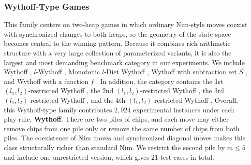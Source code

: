 \documentclass[review]{elsarticle}
\newcommand{\set}[1]{\{ #1 \}}
\newcommand{\tuple}[1]{\langle {#1} \rangle}
\newcommand{\true}{\top}
\newcommand{\statevar}{\mathcal{X}}
\newcommand{\act}{\mathcal{A}}
\newcommand{\constraint}{\mathcal{C}}
\newcommand{\estate}{\mathcal{E}}
\newcommand{\pre}{\mathtt{pre}}
\newcommand{\eff}{\mathtt{eff}}
\begin{document}
{\color{red}\subsubsection{Wythoff-Type Games}}
{\color{red}This family centers on two-heap games in which ordinary Nim-style moves coexist with synchronized changes to both heaps, so the geometry of the state space becomes central to the winning pattern.}
{\color{red}Because it combines rich arithmetic structure with a very large collection of parameterized variants, it is also the largest and most demanding benchmark category in our experiments.}
{\color{red}We include Wythoff \cite{Wyt1907}, $l$-Wythoff \cite{Fra1982}, Monotonic $l$-Diet Wythoff \cite{AhnCCEFGGKMPS2017}, Wythoff with subtraction set $S$ \cite{DucFGN2009}, and Wythoff with a function $f$ \cite{LiuZ2015}.}
{\color{red}In addition, the category contains the 1st $(l_1,l_2)$-restricted Wythoff \cite{FraH2014}, the 2nd $(l_1,l_2)$-restricted Wythoff \cite{Gur2012}, the 3rd $(l_1,l_2)$-restricted Wythoff \cite{LiuL2014}, and the 4th $(l_1,l_2)$-restricted Wythoff \cite{EriS2009}.}
{\color{red}Overall, this Wythoff-type family contributes $2,924$ experimental instances under each play rule.}
{\color{red}\textbf{Wythoff}. There are two piles of chips, and each move may either remove chips from one pile only or remove the same number of chips from both piles.}
{\color{red}The coexistence of Nim moves and synchronized diagonal moves makes this class structurally richer than standard Nim.}
{\color{red}We restrict the second pile by $m \le 5$ and include one unrestricted version, which gives $21$ test cases in total.}
\end{document}
